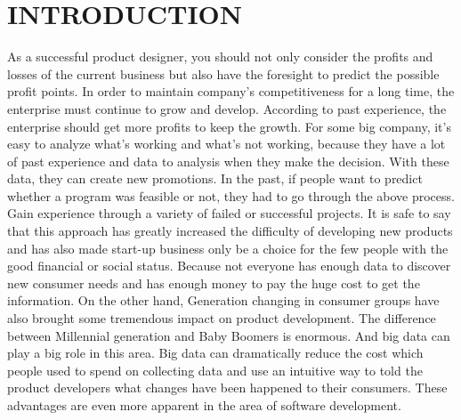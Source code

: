\documentclass[sigconf]{acmart}
\begin{document}
\section{INTRODUCTION}
As a successful product designer,  you should not only consider the profits and losses of the current business but also have the foresight to predict the possible profit points. In order to maintain company's competitiveness for a long time, the enterprise must continue to grow and develop. According to past experience, the enterprise should get more profits to keep the growth. For some big company, it's easy to analyze what's working and what's not working, because they have a lot of past experience and data to analysis when they make the decision. With these data, they can create new promotions. 
In the past, if people want to predict whether a program was feasible or not, they had to go through the above process. Gain experience through a variety of failed or successful projects. It is safe to say that this approach has greatly increased the difficulty of developing new products and has also made start-up business only be a choice for the few people with the good financial or social status. Because not everyone has enough data to discover new consumer needs and has enough money to pay the huge cost to get the information. On the other hand, Generation changing in consumer groups have also brought some tremendous impact on product development. The difference between Millennial generation and Baby Boomers is enormous. And big data can play a big role in this area. Big data can dramatically reduce the cost which people used to spend on collecting data and use an intuitive way to told the product developers what changes have been happened to their consumers. These advantages are even more apparent in the area of software development.
\end{document}
